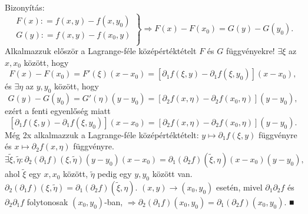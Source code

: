 \documentclass[12pt,a4paper]{scrartcl}
\newenvironment{bizonyitas}{}{}
\begin{document}
\begin{bizonyitas}
Bizonyítás: \[\left. \left. \begin{array}{l}
{F\left( x \right): = f\left( {x,y} \right) - f\left( {x,y_{0}} \right)} \\
{G\left( y \right): = f\left( {x,y} \right) - f\left( {x_{0},y} \right)} \\
\end{array} \right\}\Rightarrow F\left( x \right) - F\left( x_{0} \right) = G\left( y \right) - G{\left( y_{0} \right).} \right.\]
Alkalmazzuk először a Lagrange-féle középértéktételt \(F\) és \(G\)
függvényekre! \(\exists\xi\) az \(x,x_{0}\) között, hogy
\[F\left( x \right) - F\left( x_{0} \right) = F'\left( \xi \right)\left( {x - x_{0}} \right) = \left\lbrack {\partial_{1}f\left( {\xi,y} \right) - \partial_{1}f\left( {\xi,y_{0}} \right)} \right\rbrack{\left( {x - x_{0}} \right),}\]
és \(\exists\eta\) az \(y,y_{0}\) között, hogy
\[G\left( y \right) - G\left( y_{0} \right) = G'\left( \eta \right)\left( {y - y_{0}} \right) = \left\lbrack {\partial_{2}f\left( {x,\eta} \right) - \partial_{2}f\left( {x_{0},\eta} \right)} \right\rbrack{\left( {y - y_{0}} \right),}\]
ezért a fenti egyenlőség miatt
\[\left\lbrack {\partial_{1}f\left( {\xi,y} \right) - \partial_{1}f\left( {\xi,y_{0}} \right)} \right\rbrack\left( {x - x_{0}} \right) = \left\lbrack {\partial_{2}f\left( {x,\eta} \right) - \partial_{2}f\left( {x_{0},\eta} \right)} \right\rbrack{\left( {y - y_{0}} \right).}\]
Még 2x alkalmazzuk a Lagrange-féle középértéktételt:
\(\left. y\mapsto\partial_{1}f\left( {\xi,y} \right) \right.\)
függvényre és
\(\left. x\mapsto\partial_{2}f\left( {x,\eta} \right) \right.\)
függvényre.
\[\exists\widetilde{\xi},\widetilde{\eta}:\partial_{2}\left( {\partial_{1}f} \right)\left( {\xi,\widetilde{\eta}} \right)\left( {y - y_{0}} \right)\left( {x - x_{0}} \right) = \partial_{1}\left( {\partial_{2}f} \right)\left( {\widetilde{\xi},\eta} \right)\left( {x - x_{0}} \right){\left( {y - y_{0}} \right),}\]
ahol \(\widetilde{\xi}\) egy \(x,x_{0}\) között, \(\widetilde{\eta}\)
pedig egy \(y,y_{0}\) között van.
\(\partial_{2}\left( {\partial_{1}f} \right)\left( {\xi,\widetilde{\eta}} \right) = \partial_{1}\left( {\partial_{2}f} \right)\left( {\widetilde{\xi},\eta} \right)\).
\(\left. \left( {x,y} \right)\rightarrow\left( {x_{0},y_{0}} \right) \right.\)
esetén, mivel \(\partial_{1}\partial_{2}f\) és
\(\partial_{2}\partial_{1}f\) folytonosak
\(\left( {x_{0},y_{0}} \right)\)-ban,
\(\left. \Rightarrow\partial_{2}\left( {\partial_{1}f} \right)\left( {x_{0},y_{0}} \right) = \partial_{1}\left( {\partial_{2}f} \right)\left( {x_{0},y_{0}} \right) \right.\).
■

\end{bizonyitas}
\end{document}
